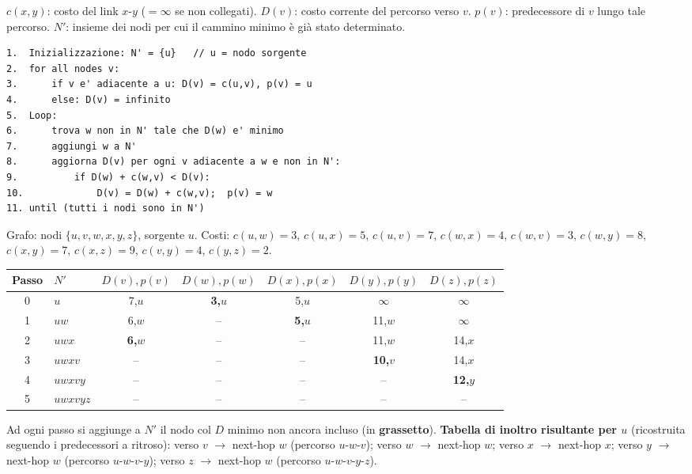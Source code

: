 \documentclass[12pt, a4paper]{article}
\begin{document}
\begin{tcolorbox}[colback=lightergray!10, colframe=tocsec, title=\textbf{Notazione e pseudocodice}]
$c(x,y)$: costo del link $x$-$y$ ($=\infty$ se non collegati). $D(v)$: costo corrente del percorso verso $v$. $p(v)$: predecessore di $v$ lungo tale percorso. $N'$: insieme dei nodi per cui il cammino minimo è già stato determinato.
\begin{verbatim}
1.  Inizializzazione: N' = {u}   // u = nodo sorgente
2.  for all nodes v:
3.      if v e' adiacente a u: D(v) = c(u,v), p(v) = u
4.      else: D(v) = infinito
5.  Loop:
6.      trova w non in N' tale che D(w) e' minimo
7.      aggiungi w a N'
8.      aggiorna D(v) per ogni v adiacente a w e non in N':
9.          if D(w) + c(w,v) < D(v):
10.             D(v) = D(w) + c(w,v);  p(v) = w
11. until (tutti i nodi sono in N')
\end{verbatim}
\end{tcolorbox}

\begin{tcolorbox}[colback=orange!5, colframe=orange!70!black, title=\textbf{Esempio completo}]
Grafo: nodi $\{u,v,w,x,y,z\}$, sorgente $u$. Costi: $c(u,w){=}3$, $c(u,x){=}5$, $c(u,v){=}7$, $c(w,x){=}4$, $c(w,v){=}3$, $c(w,y){=}8$, $c(x,y){=}7$, $c(x,z){=}9$, $c(v,y){=}4$, $c(y,z){=}2$.

\begin{center}
\small
\begin{tabular}{clccccc}
\toprule
\textbf{Passo} & $N'$ & $D(v),p(v)$ & $D(w),p(w)$ & $D(x),p(x)$ & $D(y),p(y)$ & $D(z),p(z)$ \\
\midrule
0 & $u$ & 7,$u$ & \textbf{3,$u$} & 5,$u$ & $\infty$ & $\infty$ \\
1 & $uw$ & 6,$w$ & -- & \textbf{5,$u$} & 11,$w$ & $\infty$ \\
2 & $uwx$ & \textbf{6,$w$} & -- & -- & 11,$w$ & 14,$x$ \\
3 & $uwxv$ & -- & -- & -- & \textbf{10,$v$} & 14,$x$ \\
4 & $uwxvy$ & -- & -- & -- & -- & \textbf{12,$y$} \\
5 & $uwxvyz$ & -- & -- & -- & -- & -- \\
\bottomrule
\end{tabular}
\end{center}

Ad ogni passo si aggiunge a $N'$ il nodo col $D$ minimo non ancora incluso (in \textbf{grassetto}). \textbf{Tabella di inoltro risultante per $u$} (ricostruita seguendo i predecessori a ritroso): verso $v$ $\to$ next-hop $w$ (percorso $u$-$w$-$v$); verso $w$ $\to$ next-hop $w$; verso $x$ $\to$ next-hop $x$; verso $y$ $\to$ next-hop $w$ (percorso $u$-$w$-$v$-$y$); verso $z$ $\to$ next-hop $w$ (percorso $u$-$w$-$v$-$y$-$z$).
\end{tcolorbox}
\end{document}
